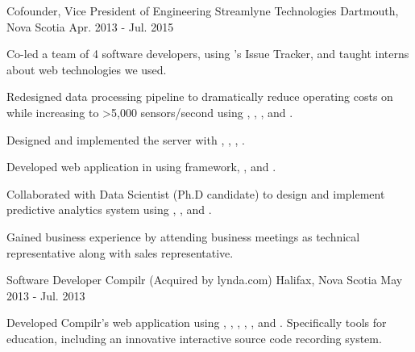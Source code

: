 \begin{cventries}
  \cventry
    {Cofounder, Vice President of Engineering} %
    {Streamlyne Technologies}  %
    {Dartmouth, Nova Scotia} %
    {Apr. 2013 - Jul. 2015} %
    {
      \begin{cvitems} %
	\item {Co-led a team of 4 software developers, using 's Issue Tracker, and taught interns about web technologies we used.}
	\item {Redesigned data processing pipeline to dramatically reduce operating costs on  while increasing to >5,000 sensors/second using , , , and .}
	\item {Designed and implemented the  server with , , , .}
	\item {Developed web application in  using  framework, , and .}
	\item {Collaborated with Data Scientist (Ph.D candidate) to design and implement predictive analytics system using , , and .}
	\item {Gained business  experience by attending business meetings as technical representative along with sales representative.}
      \end{cvitems} 
    }

  \cventry
    {Software Developer} %
    {Compilr (Acquired by lynda.com)} %
    {Halifax, Nova Scotia} %
    {May 2013 - Jul. 2013} %
    {
      \begin{cvitems} %
	\item {Developed Compilr's web application using , , , , , and . Specifically tools for education, including an innovative interactive source code recording system.}
      \end{cvitems}
    }

\end{cventries}
